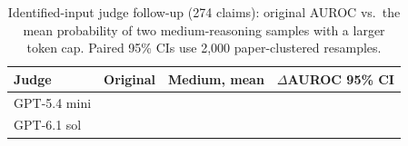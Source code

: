 \begin{table}[t]\centering
\caption{Identified-input judge follow-up (274 claims): original AUROC vs.\ the mean probability of two medium-reasoning samples with a larger token cap. Paired 95\% CIs use 2,000 paper-clustered resamples.}\label{tab:strongjudges}
\scriptsize\setlength{\tabcolsep}{3pt}
\begin{tabular}{@{}lccc@{}}\toprule
Judge & Original & Medium, mean & $\Delta$AUROC 95\% CI \\\midrule
GPT-5.4 mini & \fuMiniJudgeLow{} & \fuMiniJudgeAvg{} & \fuMiniJudgeDeltaCi{} \\
GPT-6.1 sol & \fuSolJudgeLow{} & \fuSolJudgeAvg{} & \fuSolJudgeDeltaCi{} \\
\bottomrule\end{tabular}\end{table}
